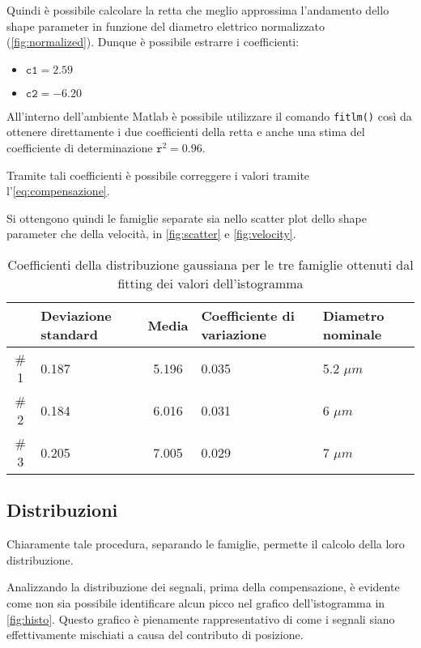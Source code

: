 Quindi è possibile calcolare la retta che meglio approssima l'andamento dello shape parameter in funzione del diametro elettrico normalizzato (\cref{fig:normalized}). Dunque è possibile estrarre i coefficienti:
\begin{itemize}
	\item $\mathtt{c1}=2.59$
	\item $\mathtt{c2}=-6.20$
\end{itemize}

All'interno dell'ambiente Matlab è possibile utilizzare il comando \texttt{fitlm()} così da ottenere direttamente i due coefficienti della retta e anche una stima del coefficiente di determinazione $\mathtt{r}^2=0.96$. 

Tramite tali coefficienti è possibile correggere i valori tramite l'\cref{eq:compensazione}.

Si ottengono quindi le famiglie separate sia nello scatter plot dello shape parameter che della velocità, in \cref{fig:scatter} e \cref{fig:velocity}.

\begin{table}[b!]
	\centering
	\begin{tabular}{|c|p{ 1.5 cm}|c|p{1.9 cm}|p{ 1.4 cm}|}
		\hline
		& \footnotesize{Deviazione standard} & \footnotesize{Media} & \footnotesize{Coefficiente di variazione} & \footnotesize{Diametro nominale} \\
		\hline
		\# 1 & 0.187 & 5.196 & 0.035 & 5.2 $\mu m$ \\
		\hline
		\# 2 & 0.184 & 6.016 & 0.031 & 6 $\mu m$\\
		\hline
		\# 3 & 0.205 & 7.005 & 0.029 & 7 $\mu m$\\
		\hline
	\end{tabular}
	\caption{Coefficienti della distribuzione gaussiana per le tre famiglie ottenuti dal fitting dei valori dell'istogramma}
	\label{tab:fithist}
\end{table}

\subsection{Distribuzioni}

Chiaramente tale procedura, separando le famiglie, permette il calcolo della loro distribuzione.

Analizzando la distribuzione dei segnali, prima della compensazione, è evidente come non sia possibile identificare alcun picco nel grafico dell'istogramma in \cref{fig:histo}. 
Questo grafico è pienamente rappresentativo di come i segnali siano effettivamente mischiati a causa del contributo di posizione.

